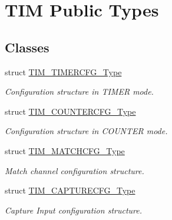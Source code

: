 \hypertarget{group___t_i_m___public___types}{\section{\-T\-I\-M \-Public \-Types}
\label{group___t_i_m___public___types}
}
\subsection*{\-Classes}
\begin{DoxyCompactItemize}
\item 
struct \hyperlink{struct_t_i_m___t_i_m_e_r_c_f_g___type}{\-T\-I\-M\-\_\-\-T\-I\-M\-E\-R\-C\-F\-G\-\_\-\-Type}
\begin{DoxyCompactList}\small\item\em \-Configuration structure in \-T\-I\-M\-E\-R mode. \end{DoxyCompactList}\item 
struct \hyperlink{struct_t_i_m___c_o_u_n_t_e_r_c_f_g___type}{\-T\-I\-M\-\_\-\-C\-O\-U\-N\-T\-E\-R\-C\-F\-G\-\_\-\-Type}
\begin{DoxyCompactList}\small\item\em \-Configuration structure in \-C\-O\-U\-N\-T\-E\-R mode. \end{DoxyCompactList}\item 
struct \hyperlink{struct_t_i_m___m_a_t_c_h_c_f_g___type}{\-T\-I\-M\-\_\-\-M\-A\-T\-C\-H\-C\-F\-G\-\_\-\-Type}
\begin{DoxyCompactList}\small\item\em \-Match channel configuration structure. \end{DoxyCompactList}\item 
struct \hyperlink{struct_t_i_m___c_a_p_t_u_r_e_c_f_g___type}{\-T\-I\-M\-\_\-\-C\-A\-P\-T\-U\-R\-E\-C\-F\-G\-\_\-\-Type}
\begin{DoxyCompactList}\small\item\em \-Capture \-Input configuration structure. \end{DoxyCompactList}\end{DoxyCompactItemize}
